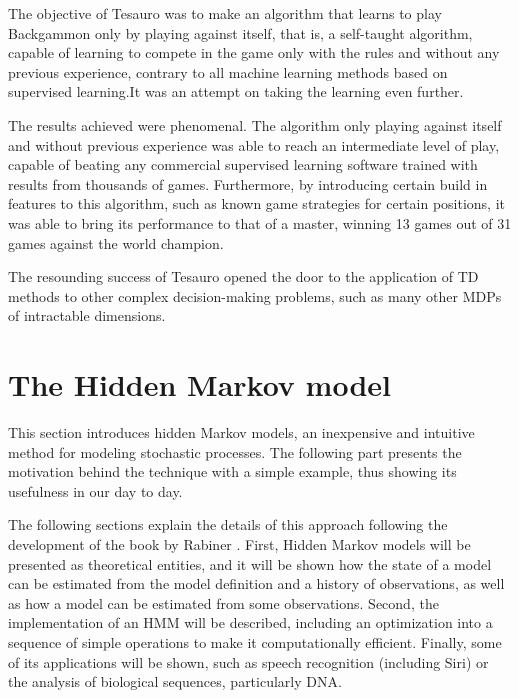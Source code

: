\documentclass[12pt]{article}
\numberwithin{equation}{section}
\begin{document}
The objective of Tesauro was to make an algorithm that learns to play Backgammon only by playing against itself, that is, a self-taught algorithm, capable of learning to compete in the game only with the rules and without any previous experience, contrary to all machine learning methods based on supervised learning.It was an attempt on taking the learning even further.



The results achieved were phenomenal. The algorithm only playing against itself and without previous experience was able to reach an intermediate level of play, capable of beating any commercial supervised learning software trained with results from thousands of games. Furthermore, by introducing certain build in features to this algorithm, such as known game strategies for certain positions, it was able to bring its performance to that of a master, winning 13 games out of 31 games against the world champion.


The resounding success of Tesauro opened the door to the application of TD methods to other complex decision-making problems, such as many other  MDPs of intractable dimensions.


\section{The Hidden Markov model}

This section introduces hidden Markov models, an inexpensive and intuitive method for modeling stochastic processes. The following part presents the motivation behind the technique with a simple example, thus showing its usefulness in our day to day.

The following sections explain the details of this approach following the development of the book by Rabiner \cite{rabiner1989tutorial}. First, Hidden Markov models will be presented as theoretical entities, and it will be shown how the state of a model can be estimated from the model definition and a history of observations, as well as how a model can be estimated from some observations. Second, the implementation of an HMM will be described, including an optimization into a sequence of simple operations to make it computationally efficient. Finally, some of its applications will be shown, such as speech recognition (including Siri) or the analysis of biological sequences, particularly DNA.
\end{document}
